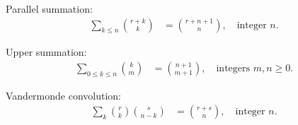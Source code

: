 \begin{identity}
    Parallel summation:
    \begin{align*}
        \sum_{k \leq n} \binom{r + k}{k} &= \binom{r + n + 1}{n}, \quad \text{integer } n.
    \end{align*}
\end{identity}

\begin{identity}
    Upper summation:
    \begin{align*}
        \sum_{0 \leq k \leq n} \binom{k}{m} &= \binom{n + 1}{m + 1}, \quad \text{integers } m, n \geq 0.
    \end{align*}
\end{identity}

\begin{identity}
    Vandermonde convolution:
    \begin{align*}
        \sum_{k} \binom{r}{k} \binom{s}{n-k} &= \binom{r + s}{n}, \quad \text{integer } n.
    \end{align*}
\end{identity}
